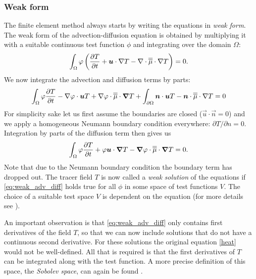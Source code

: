 \subsubsection{Weak form}
   The finite element method always starts by writing the
equations in \emph{weak form}.  The weak form of the advection-diffusion
equation is obtained by multiplying it with a suitable continuous test
function $\phi$ and integrating over the domain $\Omega$:
\begin{equation}
  \int_\Omega \varphi \left( \frac{\partial T}{\partial t} + {\mbox{\boldmath$u$}}\cdot\nabla T - 
    \nabla\cdot\overline{\overline{\mu}}\cdot \nabla T\right) = 0.
\end{equation}
We now integrate the advection and diffusion terms by parts:
\begin{equation}\label{eq:weak_adv_diff}
  \int_\Omega 
  \varphi \frac{\partial T}{\partial t} -
    \nabla\varphi\cdot{\mbox{\boldmath$u$}} T +
    \nabla\varphi\cdot \overline{\overline{\mu}}\cdot{\mbox{\boldmath$\nabla$}} T 
    +\int_{\partial\Omega} {\mbox{\boldmath$n$}}\cdot {\mbox{\boldmath$u$}} T 
    - {\mbox{\boldmath$n$}}\cdot\overline{\overline{\mu}}\cdot\nabla T 
    = 0
\end{equation}
For simplicity sake let us first assume the boundaries are closed
($\vec{u}\cdot\vec{n}=0$) and we apply a homogeneous Neumann boundary
condition everywhere: $\partial T/\partial n=0$.  Integration by parts of
the diffusion term then gives us
\begin{equation}\label{eq:weak_adv_diff}
  \int_\Omega \varphi \frac{\partial T}{\partial t} + 
    \varphi{\mbox{\boldmath$u$}}\cdot{\mbox{\boldmath$\nabla$}} T -
    {\mbox{\boldmath$\nabla$}}\varphi\cdot \overline{\overline{\mu}}\cdot{\mbox{\boldmath$\nabla$}} T = 0. 
\end{equation}
Note that due to the Neumann boundary condition the boundary term has
dropped out. The tracer field $T$ is now called a \emph{weak solution} of
the equations if \eqref{eq:weak_adv_diff} holds true for all $\phi$ in some
space of test functions $V$. The choice of a suitable test space $V$ is dependent
on the equation (for more details see \citet{elman08}).

 An important observation is that
\eqref{eq:weak_adv_diff} only contains first derivatives of the field $T$,
so that we can now include solutions that do not have a continuous second
derivative. For these solutions the original equation \eqref{heat} would not
be well-defined. All that is required is that the first derivatives of $T$
can be integrated along with the test function. A more precise definition of
this space, the \emph{Sobolev space}, can again be found \citet{elman08}.

